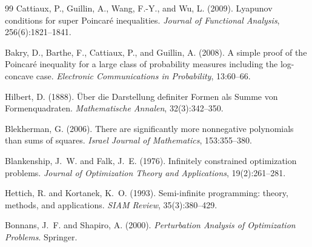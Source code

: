 \begin{thebibliography}{99}
Cattiaux, P., Guillin, A., Wang, F.-Y., and Wu, L. (2009).
Lyapunov conditions for super Poincar\'e inequalities.
\emph{Journal of Functional Analysis}, 256(6):1821--1841.

Bakry, D., Barthe, F., Cattiaux, P., and Guillin, A. (2008).
A simple proof of the Poincar\'e inequality for a large class of probability measures including the log-concave case.
\emph{Electronic Communications in Probability}, 13:60--66.

Hilbert, D. (1888).
\"Uber die Darstellung definiter Formen als Summe von Formenquadraten.
\emph{Mathematische Annalen}, 32(3):342--350.

Blekherman, G. (2006).
There are significantly more nonnegative polynomials than sums of squares.
\emph{Israel Journal of Mathematics}, 153:355--380.

Blankenship, J.~W. and Falk, J.~E. (1976).
Infinitely constrained optimization problems.
\emph{Journal of Optimization Theory and Applications}, 19(2):261--281.

Hettich, R. and Kortanek, K.~O. (1993).
Semi-infinite programming: theory, methods, and applications.
\emph{SIAM Review}, 35(3):380--429.

Bonnans, J.~F. and Shapiro, A. (2000).
\emph{Perturbation Analysis of Optimization Problems}.
Springer.

\end{thebibliography}
